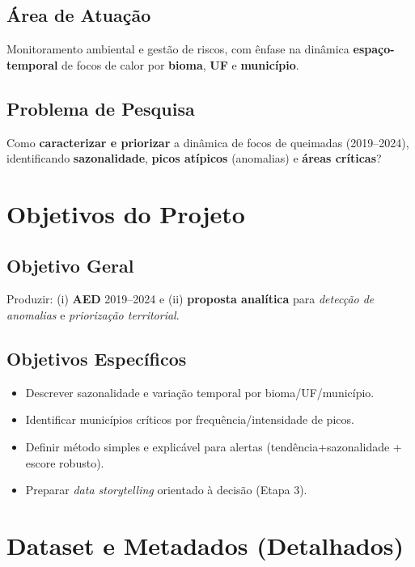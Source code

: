 \documentclass[12pt,a4paper]{report}
\begin{document}
\section{Área de Atuação}
Monitoramento ambiental e gestão de riscos, com ênfase na dinâmica \textbf{espaço-temporal} de focos de calor por \textbf{bioma}, \textbf{UF} e \textbf{município}.

\section{Problema de Pesquisa}
Como \textbf{caracterizar e priorizar} a dinâmica de focos de queimadas (2019--2024), identificando \textbf{sazonalidade}, \textbf{picos atípicos} (anomalias) e \textbf{áreas críticas}?

\chapter{Objetivos do Projeto}

\section{Objetivo Geral}
Produzir: (i) \textbf{AED} 2019--2024 e (ii) \textbf{proposta analítica} para \textit{detecção de anomalias} e \textit{priorização territorial}.

\section{Objetivos Específicos}
\begin{itemize}
  \item Descrever sazonalidade e variação temporal por bioma/UF/município.
  \item Identificar municípios críticos por frequência/intensidade de picos.
  \item Definir método simples e explicável para alertas (tendência+sazonalidade + escore robusto).
  \item Preparar \textit{data storytelling} orientado à decisão (Etapa 3).
\end{itemize}

\chapter{Dataset e Metadados (Detalhados)}
\end{document}
